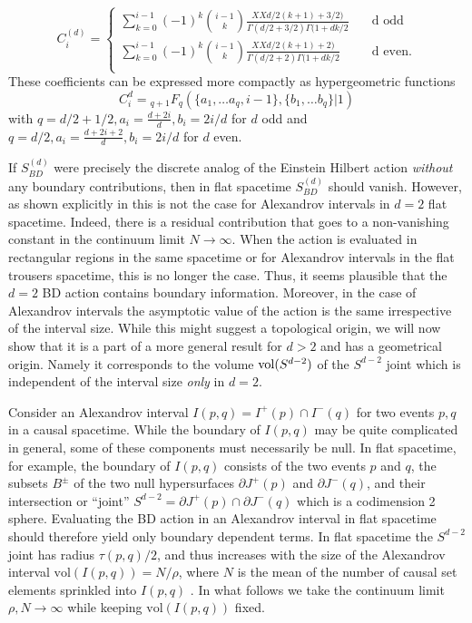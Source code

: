 \documentclass[12pt]{article}
\renewcommand{\ss}[1]{\marginnote{\color{red}{\small SS:\,#1}}}
\begin{document}
{\begin{equation}
\label{cid}
 C_i^{(d)}= 
\begin{cases} 
\sum_{k=0}^{i-1} (-1)^k\binom{i-1}{k} \frac{XXd/2(k+1)+3/2)}{\Gamma(d/2+3/2) \Gamma(1+dk/2}  \quad  &\mathrm{d \, \, odd}\\ 
\sum_{k=0}^{i-1} (-1)^k\binom{i-1}{k} \frac{XXd/2(k+1)+2)}{\Gamma(d/2+2) \Gamma(1+dk/2}  & \mathrm{d \, \,  even.}\\ 
\end{cases} 
\end{equation} 
These coefficients can be expressed more compactly as hypergeometric functions 
\begin{equation}
C_i^d={}_{q+1}F_{q}(\{ a_1, \ldots a_q, i-1\}, \{b_1, \ldots b_q \} |1)
\label{chyp} 
\end{equation} 
with $q=d/2+1/2, a_i=\frac{d+2i}{d}, b_i=2i/d$ for $d$ odd and $q=d/2, a_i=\frac{d+2i+2}{d}, b_i=2i/d$  for $d$ even.  


If $S_{BD}^{(d)}$ were precisely the discrete analog of the Einstein Hilbert action {\it without} any boundary contributions, then in flat spacetime  $S_{BD}^{(d)}$ should  vanish. However, as shown explicitly in \cite{bbdtwo} this is not the case for Alexandrov intervals in $d=2$  flat spacetime. Indeed, there is a residual contribution that goes to a non-vanishing constant in the continuum limit $N\rightarrow \infty$.  When the action is evaluated in rectangular regions in the same spacetime or for Alexandrov intervals in  the flat trousers spacetime, this is no longer the case. Thus, it seems plausible that the $d=2$ BD action contains boundary information. Moreover, in the case of Alexandrov intervals the asymptotic value of the action is the same  irrespective of the interval size. While this might suggest a  topological origin, we will now show that it is a part of a more general  result for $d>2$ and  has a geometrical origin. Namely it corresponds to the volume  $\mathrm{vol}(S^{d-2})$ of the $S^{d-2}$ joint which is independent of the interval size {\it only} in $d=2$.   

Consider an Alexandrov interval $I(p,q)=I^+(p) \cap I^-(q)$ for two events $p,q$ in a causal spacetime.   While the  boundary of $I(p,q)$ may be quite complicated in general, some of these components must necessarily be null.  In flat spacetime, for example,  the boundary of $I(p,q)$ consists of the two events $p$ and $q$, the subsets $B^\pm$ of the  two null hypersurfaces $\partial J^+(p)$ and $\partial J^-(q)$, and their intersection or ``joint''  $S^{d-2}=\partial J^+(p) \cap \partial J^-(q)$ which is a codimension 2 sphere.  Evaluating the BD action in an Alexandrov interval in flat spacetime should therefore yield  only boundary dependent terms.  In flat spacetime the $S^{d-2}$ joint  has radius $\tau(p,q)/2$, and thus increases with the size of the Alexandrov interval ${\mathrm{vol}}(I(p,q)) = N/\rho$, where $N$ is the mean of the number of causal set elements sprinkled into $I(p,q)$ . In what follows we take the continuum limit $\rho, N \rightarrow \infty$ while keeping ${\mathrm{vol}}(I(p,q))$ fixed. \ss{It would be nice to have a fancy picture of an Alex. interval here..}  

}
\end{document}

